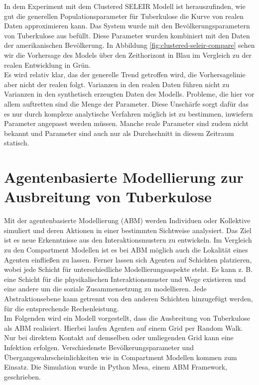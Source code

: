 \documentclass[paper=a4, fontsize=11pt, ngerman, abstract=on]{scrartcl}
\numberwithin{equation}{section} %
\numberwithin{figure}{section} %
\numberwithin{table}{section} %
\begin{document}
In dem Experiment mit dem Clustered SELEIR Modell ist herauszufinden, wie gut die generellen Populationsparameter für Tuberkulose die Kurve von realen Daten approximieren kann. Das System wurde mit den Bevölkerungsparametern von Tuberkulose aus \cite{Trauer2014} befüllt. Diese Parameter wurden kombiniert mit den Daten der amerikanischen Bevölkerung. In Abbildung \ref{fig:clustered-seleir-compare} sehen wir die Vorhersage des Models über den Zeithorizont in Blau im Vergleich zu der realen Entwicklung in Grün. \\

Es wird relativ klar, das der generelle Trend getroffen wird, die Vorhersagelinie aber nicht der realen folgt. Varianzen in den realen Daten führen nicht zu Varianzen in den synthetisch erzeugten Daten des Modells. Probleme, die hier vor allem auftretten sind die Menge der Parameter. Diese Unschärfe sorgt dafür das es nur durch komplexe analytische Verfahren möglich ist zu bestimmen, inwiefern Parameter angepasst werden müssen. Manche reale Parameter sind zudem nicht bekannt und Parameter sind auch nur als Durchschnitt in diesem Zeitraum statisch.

\section{Agentenbasierte Modellierung zur Ausbreitung von Tuberkulose}

Mit der agentenbasierte Modellierung (ABM) werden Individuen oder Kollektive simuliert und deren Aktionen in einer bestimmten Sichtweise analysiert. Das Ziel ist es neue Erkenntnisse aus den Interaktionsmustern zu entwickeln. Im Vergleich zu den Compartment Modellen ist es bei ABM möglich auch die Lokalität eines Agenten einfließen zu lassen. Ferner lassen sich Agenten auf Schichten platzieren, wobei jede Schicht für unterschiedliche Modellierungsaspekte steht. Es kann z. B. eine Schicht für die physikalischen Interaktionsmuster und Wege existieren und eine andere um die soziale Zusammensetzung zu modellieren. Jede Abstraktionsebene kann getrennt von den anderen Schichten hinzugefügt werden, für die entsprechende Rechenleistung. \\

Im Folgenden wird ein Modell vorgestellt, dass die Ausbreitung von Tuberkulose als ABM realisiert. Hierbei laufen Agenten auf einem Grid per Random Walk. Nur bei direktem Kontakt auf demselben oder umliegenden Grid kann eine Infektion erfolgen. Verschiedenste Bevölkerungsparameter und Übergangswahrscheinlichkeiten wie in Compartment Modellen kommen zum Einsatz. Die Simulation wurde in Python Mesa, einem ABM Framework, geschrieben.
\end{document}

